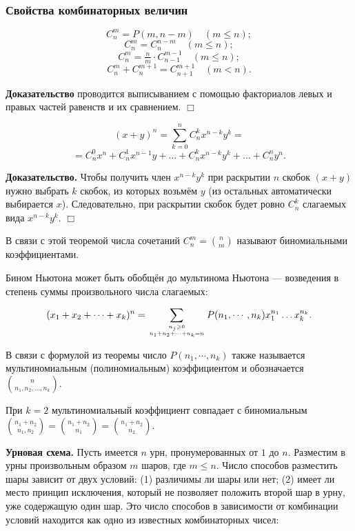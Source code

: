 	\subsubsection{Свойства комбинаторных величин}
	
	
	\begin{theorem}
		$$C_n^m=P(m,n-m) \quad (m\leqslant n);$$
		$$C_n^m=C_n^{n-m} \quad (m\leqslant n);$$
		$$C_n^m=\tfrac{n}{m}\cdot C_{n-1}^{m-1} \quad (m\leqslant n);$$
		$$C_n^m+C_n^{m+1}=C_{n+1}^{m+1} \quad (m<n).$$
	\end{theorem}
\textbf{Доказательство} проводится выписыванием с помощью факториалов левых и правых частей равенств и их сравнением. $\Box$
	
	\begin{theorem}
		$$(x+y)^n = \sum_{k=0}^n C_{n}^{k} x^{n - k} y^k =$$
		$$={C_n^0}x^n + {C_n^1}x^{n - 1}y + \ldots + {C_n^k}x^{n - k}y^k + \ldots + {C_n^n}y^n.$$
	\end{theorem}
\textbf{Доказательство.} Чтобы получить член $x^{n - k}y^k$ при раскрытии $n$ скобок $(x+y)$ нужно выбрать $k$ скобок, из которых возьмём $y$ (из остальных автоматически выбирается $x$). Следовательно, при раскрытии скобок будет ровно $C_n^k$ слагаемых вида $x^{n - k}y^k$. $\Box$
	
	В связи с этой теоремой числа сочетаний $C_n^m=\binom{n}{m}$ называют биномиальными коэффициентами.
	
	Бином Ньютона может быть обобщён до мультинома Ньютона --- возведения в степень суммы произвольного числа слагаемых:
	\begin{theorem}
		$$(x_1 + x_2 + \cdots + x_k)^n =\sum\limits_{n_j \geqslant 0 \atop n_1 + n_2 + \cdots + n_k = n} P(n_1, \cdots, n_k) x_1^{n_1} \ldots x_k^{n_k}.$$
	\end{theorem}
	
	В связи с формулой из теоремы число $P(n_1,  \cdots, n_k)$ также называется мультиномиальным (полиномиальным) коэффициентом и обозначается  $\binom{n}{n_1, n_2, \ldots, n_k}$.
	\medskip
	
	При $k=2$ мультиномиальный коэффициент совпадает с биномиальным $\binom{n_1+n_2}{n_1, n_2}=\binom{n_1+n_2}{n_1}=\binom{n_1+n_2}{n_2}$.
	\bigskip
	
	\textbf{Урновая схема.}
	Пусть имеется $n$ урн, пронумерованных от $1$ до $n$. 
	Разместим в урны произвольным образом $m$ шаров, где $m\leqslant n$.
	Число способов разместить шары зависит от двух условий: (1) различимы ли шары или нет; (2) имеет ли место принцип исключения, который не позволяет положить второй шар в урну, уже содержащую один шар. 
	Это число способов в зависимости от комбинации условий находится как одно из известных комбинаторных чисел:
	\bigskip
	
